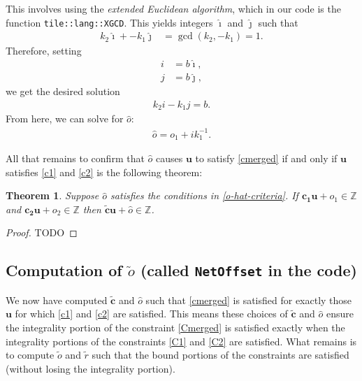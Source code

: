 \documentclass[11pt]{article}
\newcommand{\vect}[1]{\mathbf{#1}}
\newcommand{\cc}{::\allowbreak }
\newtheorem*{theorem*}{Theorem}
\begin{document}
This involves using the \emph{extended Euclidean algorithm}, which in our code is the function \texttt{tile\cc lang\cc XGCD}. This yields integers $\hat{\imath}$ and $\hat{\jmath}$ such that
\begin{align*}
k_2 \hat{\imath} + -k_1 \hat{\jmath} &= \gcd(k_2, -k_1) = 1.
\end{align*}
Therefore, setting
\begin{align*}
i &= b\hat{\imath}, \\
j &= b\hat{\jmath},
\end{align*}
we get the desired solution
\begin{align*}
k_2 i - k_1 j = b.
\end{align*}
From here, we can solve for $\widehat{o}$:
\begin{align*}
\widehat{o} = o_1 + ik_1^{-1}.
\end{align*}

All that remains to confirm that $\widehat{o}$ causes $\vect{u}$ to satisfy \eqref{cmerged} if and only if $\vect{u}$ satisfies \eqref{c1} and \eqref{c2} is the following theorem:
\begin{theorem*}
Suppose $\widehat{o}$ satisfies the conditions in \eqref{o-hat-criteria}. If $\vect{c_1}\vect{u} + o_1 \in \mathbb{Z}$ and $\vect{c_2}\vect{u} + o_2\in\mathbb{Z}$ then $\widetilde{\vect{c}}\vect{u} + \widehat{o} \in\mathbb{Z}$.
\end{theorem*}

\begin{proof}
TODO %
\end{proof}

\subsection{Computation of $\widetilde{o}$ (called \texttt{NetOffset} in the code)}

We now have computed $\widetilde{\vect{c}}$ and $\widehat{o}$ such that \eqref{cmerged} is satisfied for exactly those $\vect{u}$ for which \eqref{c1} and \eqref{c2} are satisfied. This means these choices of $\widetilde{\vect{c}}$ and $\widehat{o}$ ensure the integrality portion of the constraint \eqref{Cmerged} is satisfied exactly when the integrality portions of the constraints \eqref{C1} and \eqref{C2} are satisfied. What remains is to compute $\widetilde{o}$ and $\widetilde{r}$ such that the bound portions of the constraints are satisfied (without losing the integrality portion).
\end{document}
